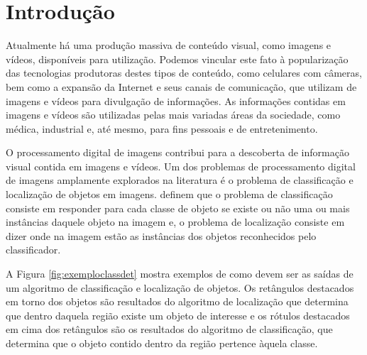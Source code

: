 \chapter{Introdução}
\label{cap:1}

\vspace{-1.9cm}
Atualmente há uma produção massiva de conteúdo visual, como imagens e vídeos, disponíveis para utilização. Podemos vincular este fato à popularização das tecnologias produtoras destes tipos de conteúdo, como celulares com câmeras, bem como a expansão da Internet e seus canais de comunicação, que utilizam de imagens e vídeos para divulgação de informações. As informações contidas em imagens e vídeos são utilizadas pelas mais variadas áreas da sociedade, como médica, industrial e, até mesmo, para fins pessoais e de entretenimento.

O processamento digital de imagens contribui para a descoberta de informação visual contida em imagens e vídeos. Um dos problemas de processamento digital de imagens amplamente explorados na literatura é o problema de classificação e localização de objetos em imagens.  definem que o problema de classificação consiste em responder para cada classe de objeto se existe ou não uma ou mais instâncias daquele objeto na imagem e, o problema de localização consiste em dizer onde na imagem estão as instâncias dos objetos reconhecidos pelo classificador.

A Figura \ref{fig:exemploclassdet} mostra exemplos de como devem ser as saídas de um algoritmo de classificação e localização de objetos. Os retângulos destacados em torno dos objetos são resultados do algoritmo de localização que determina que dentro daquela região existe um objeto de interesse e os rótulos destacados em cima dos retângulos são os resultados do algoritmo de classificação, que determina que o objeto contido dentro da região pertence àquela classe.

